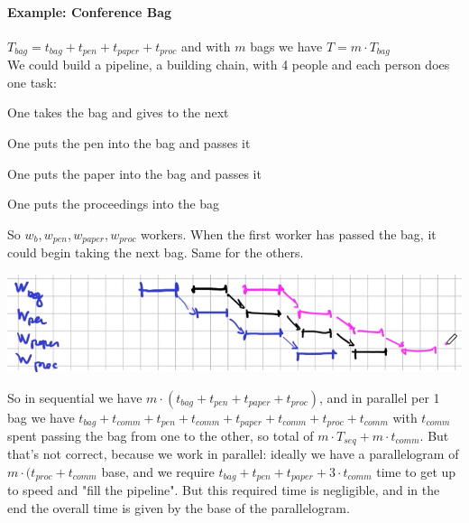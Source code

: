 \documentclass[10pt]{report}
\begin{document}
\paragraph{Example: Conference Bag} $T_{bag} = t_{bag} + t_{pen} + t_{paper} + t_{proc}$ and with $m$ bags we have $T = m\cdot T_{bag}$\\
We could build a pipeline, a building chain, with 4 people and each person does one task: \begin{list}{}{}
	\item One takes the bag and gives to the next
	\item One puts the pen into the bag and passes it
	\item One puts the paper into the bag and passes it
	\item One puts the proceedings into the bag
\end{list}
So $w_b, w_{pen}, w_{paper}, w_{proc}$ workers. When the first worker has passed the bag, it could begin taking the next bag. Same for the others.
\begin{center}
	\includegraphics[scale=0.5]{1.png}
\end{center}
So in sequential we have $m\cdot(t_{bag} + t_{pen} + t_{paper} + t_{proc})$, and in parallel per 1 bag we have $t_{bag} + t_{comm} + t_{pen} + t_{comm} + t_{paper} + t_{comm} + t_{proc} + t_{comm}$ with $t_{comm}$ spent passing the bag from one to the other, so total of $m\cdot T_{seq} + m\cdot t_{comm}$. But that's not correct, because we work in parallel: ideally we have a parallelogram of $m\cdot(t_{proc} + t_{comm}$ base, and we require $t_{bag} + t_{pen} + t_{paper} + 3\cdot t_{comm}$ time to get up to speed and "fill the pipeline". But this required time is negligible, and in the end the overall time is given by the base of the parallelogram.
\end{document}
